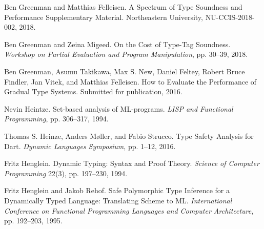\documentclass[screen=true, 10pt, acmsmall]{acmart}
\newenvironment{SingleColumn}{\begin{list}{}{\topsep=0pt\partopsep=0pt%
\listparindent=0pt\itemindent=0pt\labelwidth=0pt\leftmargin=0pt\rightmargin=0pt%
\itemsep=0pt\parsep=0pt}\item}{\end{list}}
\newenvironment{AutoBibliography}{\begin{small}}{\end{small}}
\newcommand{\Autobibentry}[1]{\hspace{0.05\linewidth}\parbox[t]{0.95\linewidth}{\parindent=-0.05\linewidth#1\vspace{1.0ex}}}
\begin{document}
\begin{AutoBibliography}
\begin{SingleColumn}
\label{t:x28autobib_x22Ben_Greenman_and_Matthias_FelleisenA_Spectrum_of_Type_Soundness_and_Performance_Supplementary_MaterialNortheastern_Universityx2c_NUx2dCCISx2d2018x2d0022018x22x29}\Autobibentry{Ben Greenman and Matthias Felleisen. A Spectrum of Type Soundness and Performance Supplementary Material. Northeastern University, NU{-}CCIS{-}2018{-}002, 2018.}

\label{t:x28autobib_x22Ben_Greenman_and_Zeina_MigeedOn_the_Cost_of_Typex2dTag_SoundnessWorkshop_on_Partial_Evaluation_and_Program_Manipulationx2c_ppx2e_30x2dx2d392018x22x29}\Autobibentry{Ben Greenman and Zeina Migeed. On the Cost of Type{-}Tag Soundness. \textit{Workshop on Partial Evaluation and Program Manipulation}, pp. 30{--}39, 2018.}

\label{t:x28autobib_x22Ben_Greenmanx2c_Asumu_Takikawax2c_Max_Sx2e_Newx2c_Daniel_Felteyx2c_Robert_Bruce_Findlerx2c_Jan_Vitekx2c_and_Matthias_FelleisenHow_to_Evaluate_the_Performance_of_Gradual_Type_SystemsSubmitted_for_publication2016x22x29}\Autobibentry{Ben Greenman, Asumu Takikawa, Max S. New, Daniel Feltey, Robert Bruce Findler, Jan Vitek, and Matthias Felleisen. How to Evaluate the Performance of Gradual Type Systems. Submitted for publication, 2016.}

\label{t:x28autobib_x22Nevin_HeintzeSetx2dbased_analysis_of_MLx2dprogramsLISP_and_Functional_Programmingx2c_ppx2e_306x2dx2d3171994x22x29}\Autobibentry{Nevin Heintze. Set{-}based analysis of ML{-}programs. \textit{LISP and Functional Programming}, pp. 306{--}317, 1994.}

\label{t:x28autobib_x22Thomas_Sx2e_Heinzex2c_Anders_Mxf8llerx2c_and_Fabio_StruccoType_Safety_Analysis_for_DartDynamic_Languages_Symposiumx2c_ppx2e_1x2dx2d122016x22x29}\Autobibentry{Thomas S. Heinze, Anders M{\o}ller, and Fabio Strucco. Type Safety Analysis for Dart. \textit{Dynamic Languages Symposium}, pp. 1{--}12, 2016.}

\label{t:x28autobib_x22Fritz_HengleinDynamic_Typingx3a_Syntax_and_Proof_TheoryScience_of_Computer_Programming_22x283x29x2c_ppx2e_197x2dx2d2301994x22x29}\Autobibentry{Fritz Henglein. Dynamic Typing: Syntax and Proof Theory. \textit{Science of Computer Programming} 22(3), pp. 197{--}230, 1994.}

\label{t:x28autobib_x22Fritz_Henglein_and_Jakob_RehofSafe_Polymorphic_Type_Inference_for_a_Dynamically_Typed_Languagex3a_Translating_Scheme_to_MLInternational_Conference_on_Functional_Programming_Languages_and_Computer_Architecturex2c_ppx2e_192x2dx2d2031995x22x29}\Autobibentry{Fritz Henglein and Jakob Rehof. Safe Polymorphic Type Inference for a Dynamically Typed Language: Translating Scheme to ML. \textit{International Conference on Functional Programming Languages and Computer Architecture}, pp. 192{--}203, 1995.}


\end{SingleColumn}
\end{AutoBibliography}
\end{document}
